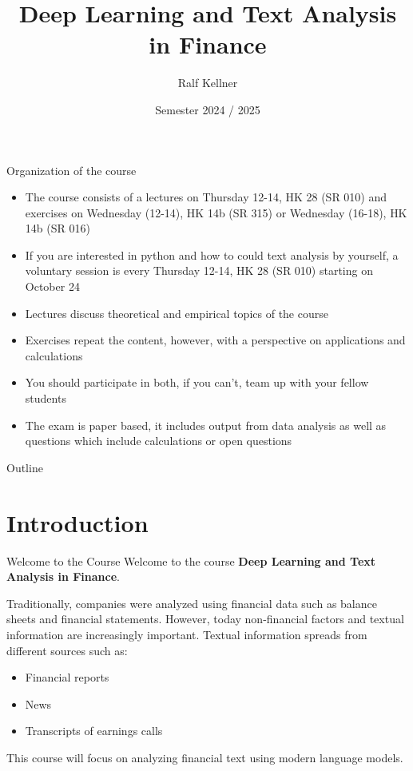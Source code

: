 \documentclass{beamer}
\title{Deep Learning and Text Analysis in Finance}
\author{Ralf Kellner}
\date{Semester 2024 / 2025}
\begin{document}
	
	\begin{frame}
		\titlepage
	\end{frame}
	
	\begin{frame}{Organization of the course}
		\begin{itemize}
			\item The course consists of a lectures on Thursday 12-14, HK 28 (SR 010) and exercises on Wednesday (12-14), HK 14b (SR 315) or Wednesday (16-18), HK 14b (SR 016)
			\item If you are interested in python and how to could text analysis by yourself, a voluntary session is every Thursday 12-14, HK 28 (SR 010) starting on October 24
			\item Lectures discuss theoretical and empirical topics of the course
			\item Exercises repeat the content, however, with a perspective on applications and calculations
			\item You should participate in both, if you can't, team up with your fellow students
			\item The exam is paper based, it includes output from data analysis as well as questions which include calculations or open questions
		\end{itemize}
	\end{frame}
	
	\begin{frame}{Outline}
		\tableofcontents
	\end{frame}
	
	\section{Introduction}
	\begin{frame}{Welcome to the Course}
		Welcome to the course \textbf{Deep Learning and Text Analysis in Finance}.
		\vspace{0.3cm}
		
		Traditionally, companies were analyzed using financial data such as balance sheets and financial statements. However, today non-financial factors and textual information are increasingly important. Textual information spreads from different sources such as:
		\begin{itemize}
			\item Financial reports
			\item News
			\item Transcripts of earnings calls
		\end{itemize}
		\vspace{0.3cm}
		This course will focus on analyzing financial text using modern language models.
	\end{frame}
	
\end{document}
